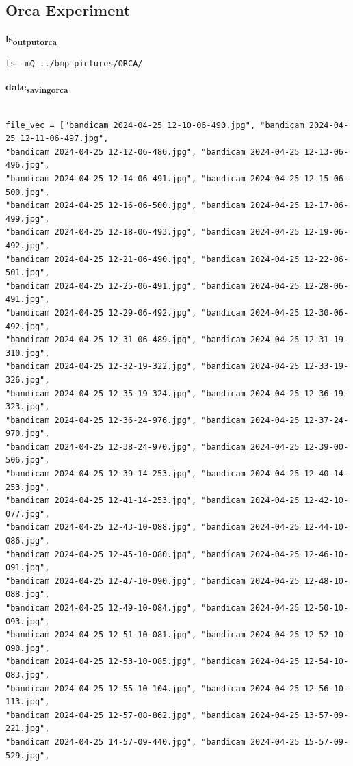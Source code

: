 \documentclass[11pt]{article}
\begin{document}
\subsection{Orca Experiment}
\label{sec:orgc03e244}
\textbf{ls\textsubscript{output}\textsubscript{orca}}
\begin{verbatim}
ls -mQ ../bmp_pictures/ORCA/
\end{verbatim}

\textbf{date\textsubscript{saving}\textsubscript{orca}}
\begin{verbatim}

file_vec = ["bandicam 2024-04-25 12-10-06-490.jpg", "bandicam 2024-04-25 12-11-06-497.jpg",
"bandicam 2024-04-25 12-12-06-486.jpg", "bandicam 2024-04-25 12-13-06-496.jpg",
"bandicam 2024-04-25 12-14-06-491.jpg", "bandicam 2024-04-25 12-15-06-500.jpg",
"bandicam 2024-04-25 12-16-06-500.jpg", "bandicam 2024-04-25 12-17-06-499.jpg",
"bandicam 2024-04-25 12-18-06-493.jpg", "bandicam 2024-04-25 12-19-06-492.jpg",
"bandicam 2024-04-25 12-21-06-490.jpg", "bandicam 2024-04-25 12-22-06-501.jpg",
"bandicam 2024-04-25 12-25-06-491.jpg", "bandicam 2024-04-25 12-28-06-491.jpg",
"bandicam 2024-04-25 12-29-06-492.jpg", "bandicam 2024-04-25 12-30-06-492.jpg",
"bandicam 2024-04-25 12-31-06-489.jpg", "bandicam 2024-04-25 12-31-19-310.jpg",
"bandicam 2024-04-25 12-32-19-322.jpg", "bandicam 2024-04-25 12-33-19-326.jpg",
"bandicam 2024-04-25 12-35-19-324.jpg", "bandicam 2024-04-25 12-36-19-323.jpg",
"bandicam 2024-04-25 12-36-24-976.jpg", "bandicam 2024-04-25 12-37-24-970.jpg",
"bandicam 2024-04-25 12-38-24-970.jpg", "bandicam 2024-04-25 12-39-00-506.jpg",
"bandicam 2024-04-25 12-39-14-253.jpg", "bandicam 2024-04-25 12-40-14-253.jpg",
"bandicam 2024-04-25 12-41-14-253.jpg", "bandicam 2024-04-25 12-42-10-077.jpg",
"bandicam 2024-04-25 12-43-10-088.jpg", "bandicam 2024-04-25 12-44-10-086.jpg",
"bandicam 2024-04-25 12-45-10-080.jpg", "bandicam 2024-04-25 12-46-10-091.jpg",
"bandicam 2024-04-25 12-47-10-090.jpg", "bandicam 2024-04-25 12-48-10-088.jpg",
"bandicam 2024-04-25 12-49-10-084.jpg", "bandicam 2024-04-25 12-50-10-093.jpg",
"bandicam 2024-04-25 12-51-10-081.jpg", "bandicam 2024-04-25 12-52-10-090.jpg",
"bandicam 2024-04-25 12-53-10-085.jpg", "bandicam 2024-04-25 12-54-10-083.jpg",
"bandicam 2024-04-25 12-55-10-104.jpg", "bandicam 2024-04-25 12-56-10-113.jpg",
"bandicam 2024-04-25 12-57-08-862.jpg", "bandicam 2024-04-25 13-57-09-221.jpg",
"bandicam 2024-04-25 14-57-09-440.jpg", "bandicam 2024-04-25 15-57-09-529.jpg",

\end{verbatim}
\end{document}
